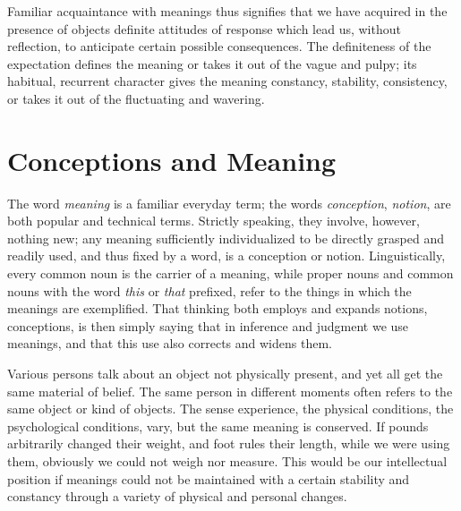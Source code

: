 \documentclass[showtrims,ustradepaper]{memoir}
\begin{document}

Familiar acquaintance with meanings thus signifies that we have acquired
in the presence of objects definite attitudes of response which lead us,
without reflection, to anticipate certain possible consequences. The
definiteness of the expectation defines the meaning or takes it out of
the vague and pulpy; its habitual, recurrent character gives the meaning
constancy, stability, consistency, or takes it out of the fluctuating
and wavering.

\section{Conceptions and Meaning}


The word \emph{meaning} is a familiar everyday term; the words
\emph{conception}, \emph{notion}, are both popular and technical terms.
Strictly speaking, they involve, however, nothing new; any meaning
sufficiently individualized to be directly grasped and readily used, and
thus fixed by a word, is a conception or notion. Linguistically, every
common noun is the carrier of a meaning, while proper nouns and common
nouns with the word \emph{this} or \emph{that} prefixed, refer to the
things in which the meanings are exemplified. That thinking both employs
and expands notions, conceptions, is then simply saying that in
inference and judgment we use meanings, and that this use also corrects
and widens them.


Various persons talk about an object not physically present, and yet all
get the same material of belief. The same person in different moments
often refers to the same object or kind of objects. The sense
experience, the physical conditions, the psychological conditions, vary,
but the same meaning is conserved. If
pounds
arbitrarily changed their weight, and foot rules their length, while we
were using them, obviously we could not weigh nor measure. This would be
our intellectual position if meanings could not be maintained with a
certain stability and constancy through a variety of physical and
personal changes.



\end{document}
